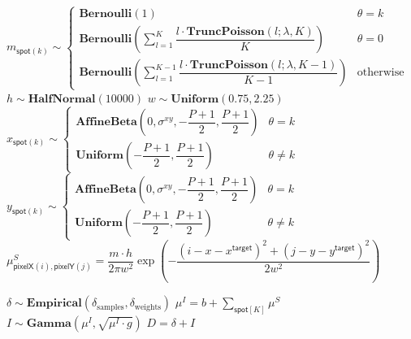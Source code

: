 \begin{algorithmic}[1]
            \State $ m_{\mathsf{spot}(k)} \sim
                \begin{cases}
                    \mathbf{Bernoulli}(1) & \text{$\theta = k$} \\
                    \mathbf{Bernoulli} \left( \sum_{l=1}^K \dfrac{l \cdot \mathbf{TruncPoisson}(l; \lambda, K)}{K} \right) & \text{$\theta = 0$} \\
                    \mathbf{Bernoulli} \left( \sum_{l=1}^{K-1} \dfrac{l \cdot \mathbf{TruncPoisson}(l; \lambda, K-1)}{K-1} \right) & \text{otherwise}
                \end{cases} $
            \State $h \sim \mathbf{HalfNormal}(10000)$
            \State $w \sim \mathbf{Uniform}(0.75, 2.25)$
            \State $ x_{\mathsf{spot}(k)} \sim
                \begin{cases}
                \mathbf{AffineBeta}\left( 0, \sigma^{xy}, -\dfrac{P+1}{2}, \dfrac{P+1}{2} \right) & \theta = k \\
                \mathbf{Uniform}\left(-\dfrac{P+1}{2}, \dfrac{P+1}{2} \right) & \theta \neq k \end{cases} $
            \State $ y_{\mathsf{spot}(k)} \sim
                \begin{cases}
                \mathbf{AffineBeta}\left( 0, \sigma^{xy}, -\dfrac{P+1}{2}, \dfrac{P+1}{2} \right) & \theta = k \\
                \mathbf{Uniform}\left(-\dfrac{P+1}{2}, \dfrac{P+1}{2} \right) & \theta \neq k \end{cases}
                $
            \State $\mu^{S}_{\mathsf{pixelX}(i), \mathsf{pixelY}(j)} =
                        \dfrac{m \cdot h}{2 \pi w^2} \exp{\left ( -\dfrac{(i-x-x^\mathsf{target})^2 + (j-y-y^\mathsf{target})^2}{2w^2} \right)}$
            \EndFor
        \EndFor
            
            \State $\delta \sim \mathbf{Empirical}( \delta_\mathrm{samples}, \delta_\mathrm{weights})$
            \State $\mu^I = b + \sum_{\mathsf{spot}[K]} \mu^S$
            \State $I \sim \mathbf{Gamma} (\mu^I, \sqrt{\mu^I \cdot g})$
            \State $D = \delta + I$
        \EndFor
    \EndFor
\EndFor
\end{algorithmic}